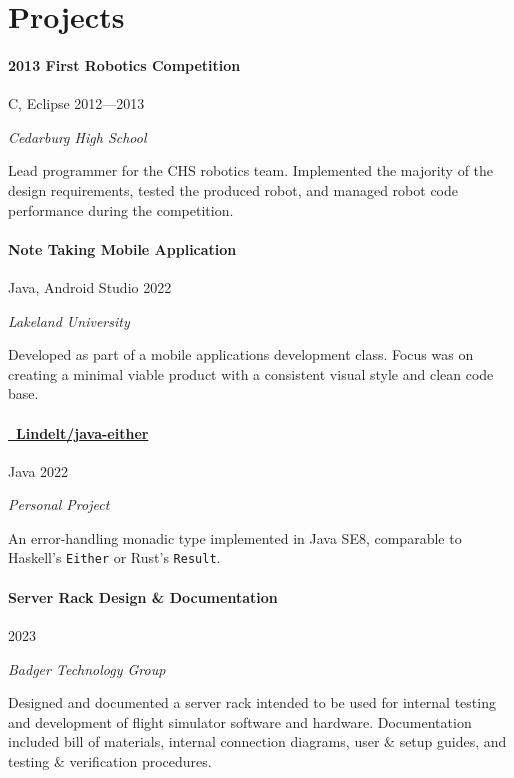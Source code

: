 \documentclass[10pt]{article}
\newcommand{\Rplus}{\protect\raisebox{0.35ex}{\smaller{\smaller{\textbf{+}}}}}
\newcommand{\Cpp}{\mbox{C\Rplus\Rplus}}
\newcommand{\firstpar}{\vspace{4pt}\noindent}
\begin{document}
\section*{Projects}
\paragraph{2013 First Robotics Competition}
\vline\quad \Cpp, Eclipse \hfill 2012---2013

\noindent
\textit{Cedarburg High School}

\firstpar
Lead programmer for the CHS robotics team. Implemented the majority of the design
requirements, tested the produced robot, and managed robot code performance during
the competition.

\paragraph{Note Taking Mobile Application}
\vline\quad Java, Android Studio \hfill 2022

\noindent
\textit{Lakeland University}

\firstpar
Developed as part of a mobile applications development class. Focus was on creating a minimal
viable product with a consistent visual style and clean code base.

\paragraph{\href{https://github.com/Lindelt/java-either}{\faGithub\ Lindelt/java-either}}
\vline\quad Java \hfill 2022

\noindent
\textit{Personal Project}

\firstpar
An error-handling monadic type implemented in Java SE8, comparable to Haskell's \texttt{Either} or
Rust's \texttt{Result}.

\paragraph{Server Rack Design \& Documentation}
\hfill 2023

\noindent
\textit{Badger Technology Group}

\firstpar
Designed and documented a server rack intended to be used for internal testing and development
of flight simulator software and hardware. Documentation included bill of materials, internal
connection diagrams, user \& setup guides, and testing \& verification procedures.
\end{document}
